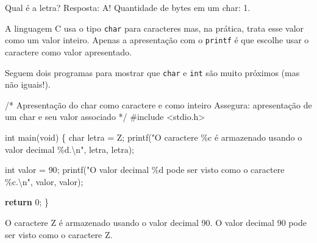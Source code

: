 \documentclass[
  letterpaper,
  DIV=11,
  numbers=noendperiod]{scrartcl}
\newenvironment{Shaded}{\begin{snugshade}}{\end{snugshade}}
\newcommand{\CharTok}[1]{\textcolor[rgb]{0.13,0.47,0.30}{#1}}
\newcommand{\CommentTok}[1]{\textcolor[rgb]{0.37,0.37,0.37}{#1}}
\newcommand{\ControlFlowTok}[1]{\textcolor[rgb]{0.00,0.23,0.31}{\textbf{#1}}}
\newcommand{\DataTypeTok}[1]{\textcolor[rgb]{0.68,0.00,0.00}{#1}}
\newcommand{\DecValTok}[1]{\textcolor[rgb]{0.68,0.00,0.00}{#1}}
\newcommand{\ImportTok}[1]{\textcolor[rgb]{0.00,0.46,0.62}{#1}}
\newcommand{\NormalTok}[1]{\textcolor[rgb]{0.00,0.23,0.31}{#1}}
\newcommand{\OperatorTok}[1]{\textcolor[rgb]{0.37,0.37,0.37}{#1}}
\newcommand{\PreprocessorTok}[1]{\textcolor[rgb]{0.68,0.00,0.00}{#1}}
\newcommand{\SpecialCharTok}[1]{\textcolor[rgb]{0.37,0.37,0.37}{#1}}
\newcommand{\StringTok}[1]{\textcolor[rgb]{0.13,0.47,0.30}{#1}}
\begin{document}
\begin{Shaded}
\begin{Highlighting}[]
\NormalTok{Qual é a letra? Resposta: A!}
\NormalTok{Quantidade de bytes em um char: 1.}
\end{Highlighting}
\end{Shaded}

A linguagem C usa o tipo \texttt{char} para caracteres mas, na prática,
trata esse valor como um valor inteiro. Apenas a apresentação com o
\texttt{printf} é que escolhe usar o caractere como valor apresentado.

Seguem dois programas para mostrar que \texttt{char} e \texttt{int} são
muito próximos (mas não iguais!).

\begin{Shaded}
\begin{Highlighting}[]
\CommentTok{/*}
\CommentTok{Apresentação do char como caractere e como inteiro}
\CommentTok{Assegura: apresentação de um char e seu valor associado}
\CommentTok{*/}
\PreprocessorTok{\#include }\ImportTok{\textless{}stdio.h\textgreater{}}

\DataTypeTok{int}\NormalTok{ main}\OperatorTok{(}\DataTypeTok{void}\OperatorTok{)} \OperatorTok{\{}
    \DataTypeTok{char}\NormalTok{ letra }\OperatorTok{=} \CharTok{\textquotesingle{}Z\textquotesingle{}}\OperatorTok{;}
\NormalTok{    printf}\OperatorTok{(}\StringTok{"O caractere }\SpecialCharTok{\%c}\StringTok{ é armazenado usando o valor decimal }\SpecialCharTok{\%d}\StringTok{.}\SpecialCharTok{\textbackslash{}n}\StringTok{"}\OperatorTok{,}
\NormalTok{           letra}\OperatorTok{,}\NormalTok{ letra}\OperatorTok{);}

    \DataTypeTok{int}\NormalTok{ valor }\OperatorTok{=} \DecValTok{90}\OperatorTok{;}
\NormalTok{    printf}\OperatorTok{(}\StringTok{"O valor decimal }\SpecialCharTok{\%d}\StringTok{ pode ser visto como o caractere }\SpecialCharTok{\%c}\StringTok{.}\SpecialCharTok{\textbackslash{}n}\StringTok{"}\OperatorTok{,}
\NormalTok{            valor}\OperatorTok{,}\NormalTok{ valor}\OperatorTok{);}

    \ControlFlowTok{return} \DecValTok{0}\OperatorTok{;}
\OperatorTok{\}}
\end{Highlighting}
\end{Shaded}

\begin{Shaded}
\begin{Highlighting}[]
\NormalTok{O caractere Z é armazenado usando o valor decimal 90.}
\NormalTok{O valor decimal 90 pode ser visto como o caractere Z.}
\end{Highlighting}
\end{Shaded}
\end{document}
